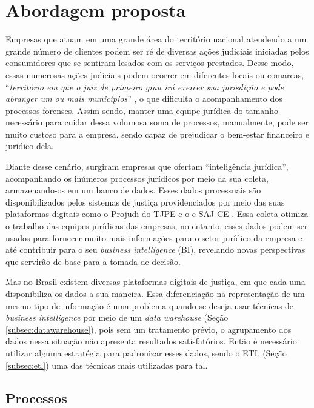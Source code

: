 \section{Abordagem proposta}
\label{abordagem}

Empresas que atuam em uma grande área do território nacional atendendo a um grande número de clientes podem ser ré de diversas ações judiciais iniciadas pelos consumidores que se sentiram lesados com os serviços prestados. Desse modo, essas numerosas ações judiciais podem ocorrer em diferentes locais ou comarcas, \enquote{\textit{território em que o juiz de primeiro grau irá exercer sua jurisdição e pode abranger um ou mais municípios}} \cite{cnj:comarca}, o que dificulta o acompanhamento dos processos forenses. Assim sendo, manter uma equipe jurídica do tamanho necessário para cuidar dessa volumosa soma de processos, manualmente, pode ser muito custoso para a empresa, sendo capaz de prejudicar o bem-estar financeiro e jurídico dela.

Diante desse cenário, surgiram empresas que ofertam \enquote{inteligência jurídica}, acompanhando os inúmeros processos jurídicos por meio da sua coleta, armazenando-os em um banco de dados. Esses dados processuais são disponibilizados pelos sistemas de justiça providenciados por meio das suas plataformas digitais como o Projudi do TJPE \cite{tjpe} e o e-SAJ CE \cite{esajce}. Essa coleta otimiza o trabalho das equipes jurídicas das empresas, no entanto, esses dados podem ser usados para fornecer muito mais informações para o setor jurídico da empresa e até contribuir para o seu \textit{business intelligence} (BI), revelando novas perspectivas que servirão de base para a tomada de decisão.

Mas no Brasil existem diversas plataformas digitais de justiça, em que cada uma disponibiliza os dados a sua maneira. Essa diferenciação na representação de um mesmo tipo de informação é uma problema quando se deseja usar técnicas de \textit{business intelligence} por meio de um \textit{data warehouse} (Seção \ref{subsec:datawarehouse}), pois sem um tratamento prévio, o agrupamento dos dados nessa situação não apresenta resultados satisfatórios. Então é necessário utilizar alguma estratégia para padronizar esses dados, sendo o ETL (Seção \ref{subsec:etl}) uma das técnicas mais utilizadas para tal.


\subsection{Processos}
\label{processos}

